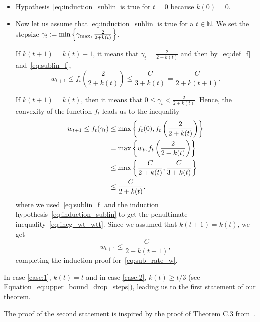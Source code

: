 \documentclass[twoside]{article}
\newcommand{\N}{\mathbb{N}}
\newcommand{\stepsize}{\gamma}
\newcommand{\stepmax}{\stepsize_{\textnormal{\scriptsize max}}} %
\newcommand{\0}{\mathbf{0}} %
\begin{document}
      \begin{itemize}
        \item 
      Hypothesis~\eqref{eq:induction_sublin} is true for $t=0$ because $k(0)=0$. 
        \item 
      Now let us assume that \eqref{eq:induction_sublin} is true for a $t \in \N$.
      We set the stepsize $\stepsize_t := \min \left\{\stepmax,\frac{2}{2+k(t)}\right\}$.

      If $k(t+1)=k(t)+1$, it means that $\stepsize_t = \frac{2}{2+k(t)}$ and then by~\eqref{eq:def_f} and~\eqref{eq:sublin_f},
      \begin{equation} \label{eq:proof_w_sublin}
         w_{t+1} 
         \leq 
          f_t\left(\frac{2}{2+k(t)}\right) 
         \leq \frac{C}{3+k(t)}
         =  \frac{C}{2+k(t+1)}.
      \end{equation}

      If $k(t+1)= k(t)$, then it means that $0 \leq \stepsize_t < \frac{2}{2+k(t)}$. Hence, the convexity of the function $f_t$ leads us to the inequality
      \begin{align} \notag 
       w_{t+1} \leq f_t(\stepsize_t) 
       &\leq \max \left\{ f_t(0),f_t\left(\frac{2}{2+k(t)}\right) \right\} \\
       & = \max \left\{ w_t,f_t\left(\frac{2}{2+k(t)}\right) \right\}\label{eq:ineg_wt_wtt} \\
       &\leq \max \left\{ \frac{C}{2+k(t)},\frac{C}{3+k(t)} \right\} \\
       &\leq \frac{C}{2+k(t)}.
       \end{align} 
      where we used~\eqref{eq:sublin_f} and the induction hypothesis~\eqref{eq:induction_sublin} to get the penultimate inequality~\eqref{eq:ineg_wt_wtt}. Since we assumed that $k(t+1)= k(t)$, we get
      \begin{equation}
        w_{t+1} \leq  \frac{C}{2+k(t+1)}, 
      \end{equation}
      completing the induction proof for~\eqref{eq:sub_rate_w}.
      \end{itemize}
      



      In case \eqref{case:1}, $k(t) = t$ and in case \eqref{case:2}, $k(t) \geq t/3$ (see Equation~\eqref{eq:upper_bound_drop_steps}), leading us to the first statement of our theorem.

The proof of the second statement is inspired by the proof of Theorem C.3 from~\citep{lacoste2013block}.
\end{document}
